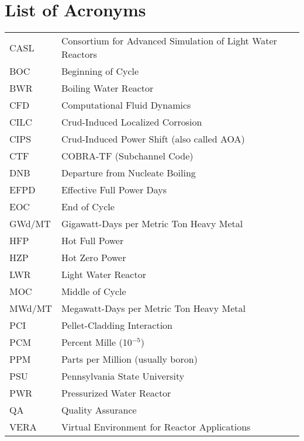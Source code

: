 \documentclass{report}
\numberwithin{equation}{section}
\begin{document}

\tableofcontents


\chapter*{List of Acronyms}

\begin{table}[htb]
\begin{tabular}{ll}
  CASL   & Consortium for Advanced Simulation of Light Water Reactors \\
  BOC    & Beginning of Cycle \\
  BWR    & Boiling Water Reactor \\
  CFD    & Computational Fluid Dynamics \\
  CILC   & Crud-Induced Localized Corrosion \\
  CIPS   & Crud-Induced Power Shift (also called AOA) \\
  CTF    & COBRA-TF (Subchannel Code) \\
  DNB    & Departure from Nucleate Boiling \\
  EFPD   & Effective Full Power Days \\
  EOC    & End of Cycle \\
  GWd/MT & Gigawatt-Days per Metric Ton Heavy Metal \\
  HFP    & Hot Full Power \\
  HZP    & Hot Zero Power \\
  LWR    & Light Water Reactor \\
  MOC    & Middle of Cycle \\
  MWd/MT & Megawatt-Days per Metric Ton Heavy Metal \\
  PCI    & Pellet-Cladding Interaction \\
  PCM    & Percent Mille (10$^{-5}$) \\
  PPM    & Parts per Million (usually boron) \\
  PSU    & Pennsylvania State University \\
  PWR    & Pressurized Water Reactor  \\
  QA     & Quality Assurance \\
  VERA   & Virtual Environment for Reactor Applications \\
\end{tabular}
\end{table}

\vfill
\end{document}

